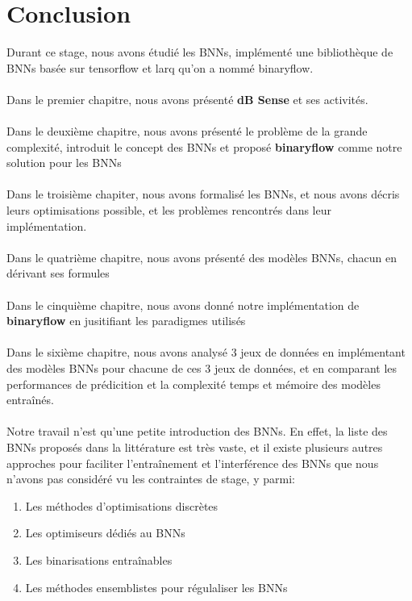 \chapter*{Conclusion}

Durant ce stage, nous avons étudié les BNNs, implémenté une bibliothèque de BNNs basée sur tensorflow et larq qu'on a nommé binaryflow. \\
\\
Dans le premier chapitre, nous avons présenté \textbf{dB Sense} et ses activités. \\
\\
Dans le deuxième chapitre, nous avons présenté le problème de la grande complexité, introduit le concept des BNNs et proposé \textbf{binaryflow} comme notre solution pour les BNNs\\
\\
Dans le troisième chapiter, nous avons formalisé les BNNs, et nous avons décris leurs optimisations possible, et les problèmes rencontrés dans leur implémentation.\\
\\
Dans le quatrième chapitre, nous avons présenté des modèles BNNs, chacun en dérivant ses formules\\
\\
Dans le cinquième chapitre, nous avons donné notre implémentation de \textbf{binaryflow} en jusitifiant les paradigmes utilisés\\
\\
Dans le sixième chapitre, nous avons analysé 3 jeux de données en implémentant des modèles BNNs pour chacune de ces 3 jeux de données, et en comparant les performances de prédicition et la complexité temps et mémoire des modèles entraînés.\\
\\
Notre travail n'est qu'une petite introduction des BNNs. En effet, la liste des BNNs proposés dans la littérature est très vaste, et il existe plusieurs autres approches pour faciliter l'entraînement et l'interférence des BNNs que nous n'avons pas considéré vu les contraintes de stage, y parmi:
\begin{enumerate}
	\item Les méthodes d'optimisations discrètes
	\item Les optimiseurs dédiés au BNNs
	\item Les binarisations entraînables
	\item Les méthodes ensemblistes pour régulaliser les BNNs
\end{enumerate} 
